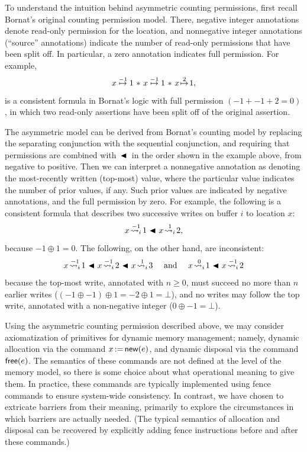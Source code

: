 \documentclass[11pt]{report}         %
\begin{document}
To understand the intuition behind asymmetric counting permissions, first recall Bornat's original counting permission model. There, negative integer annotations denote read-only permission for the location, and nonnegative integer annotations (``source'' annotations) indicate the number of read-only permissions that have been split off. In particular, a zero annotation indicates full permission. For example, \[ x \stackrel{-1}{\!\mapsto\!} 1 \operatorname{\,\ast\,} x \stackrel{-1}{\!\mapsto\!} 1 \operatorname{\,\ast\,} x \stackrel{2}{\!\mapsto\!} 1, \] is a consistent formula in Bornat's logic with full permission $(-1 + -1 + 2 = 0)$, in which two read-only assertions have been split off of the original assertion.

The asymmetric model can be derived from Bornat's counting model by replacing the separating conjunction with the sequential conjunction, and requiring that permissions are combined with $\operatorname{\,\blacktriangleleft\,}$ in the order shown in the example above, from negative to positive. Then we can interpret a nonnegative annotation as denoting the most-recently written (top-most) value, where the particular value indicates the number of prior values, if any. Such prior values are indicated by negative annotations, and the full permission by zero. For example, the following is a consistent formula that describes two successive writes on buffer $i$ to location $x$: \[ x \stackrel{-1}{\!\leadsto_{i}\!} 1 \operatorname{\,\blacktriangleleft\,} x \stackrel{1}{\!\leadsto_{i}\!} 2 , \] because $-1 \oplus 1 = 0$. The following, on the other hand, are inconsistent: \[ x \stackrel{-1}{\fwrite{i}} 1 \fsseq x \stackrel{-1}{\fwrite{i}} 2 \fsseq x \stackrel{1}{\fwrite{i}} 3 \text{ ~~~and~~~ } x \stackrel{0}{\fwrite{i}} 1 \fsseq x \stackrel{-1}{\fwrite{i}} 2 \] because the top-most write, annotated with $n \geq 0$, must succeed no more than $n$ earlier writes ($(-1 \oplus -1) \oplus 1 = -2 \oplus 1 = \bot$), and no writes may follow the top write, annotated with a non-negative integer ($0 \oplus -1 = \bot$).

Using the asymmetric counting permission described above, we may consider axiomatization of primitives for dynamic memory management; namely, dynamic allocation via the command $x \operatorname{:\!=} \operatorname{\mathsf{new}}(e)$, and dynamic disposal via the command $\operatorname{\mathsf{free}}(e)$. The semantics of these commands are not defined at the level of the memory model, so there is some choice about what operational meaning to give them. In practice, these commands are typically implemented using fence commands to ensure system-wide consistency. In contrast, we have chosen to extricate barriers from their meaning, primarily to explore the circumstances in which barriers are actually needed. (The typical semantics of allocation and disposal can be recovered by explicitly adding fence instructions before and after these commands.)
\end{document}
